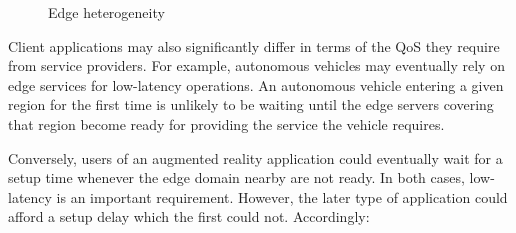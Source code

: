 \begin{figure}[tbp]
	\centering
	\captionsetup[subfigure]{width=0.5\textwidth}	
	\null\hfill
	\captionsetup[subfigure]{width=0.45\textwidth}	
	\hfill
	\hfill\null
	\caption{Edge heterogeneity}\label{fig:1}
\end{figure}


Client applications may also significantly differ in terms of the QoS they require from service providers. For example, autonomous vehicles may eventually rely on edge services for low-latency operations. An autonomous vehicle entering a given region for the first time is unlikely to be waiting until the edge servers covering that region become ready for providing the service the vehicle requires. 

Conversely, users of an augmented reality application could eventually wait for a setup time whenever the edge domain nearby are not ready. In both cases, low-latency is an important requirement. However, the later type of application could afford a setup delay which the first could not. Accordingly:

